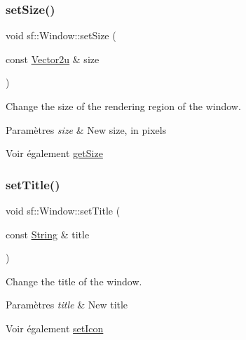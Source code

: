 \subsubsection{\texorpdfstring{set\+Size()}{setSize()}}
{\footnotesize\ttfamily void sf\+::\+Window\+::set\+Size (\begin{DoxyParamCaption}\item[{const \hyperlink{classsf_1_1Vector2}{Vector2u} \&}]{size }\end{DoxyParamCaption})}



Change the size of the rendering region of the window. 


\begin{DoxyParams}{Paramètres}
{\em size} & New size, in pixels\\
\hline
\end{DoxyParams}
\begin{DoxySeeAlso}{Voir également}
\hyperlink{classsf_1_1Window_a3969926741cbe83d7f9eeaf5333d4e71}{get\+Size} 
\end{DoxySeeAlso}
\mbox{\label{classsf_1_1Window_a3b3f3513bb6be90f5cd456c20b5fd5fa}} 
\subsubsection{\texorpdfstring{set\+Title()}{setTitle()}}
{\footnotesize\ttfamily void sf\+::\+Window\+::set\+Title (\begin{DoxyParamCaption}\item[{const \hyperlink{classsf_1_1String}{String} \&}]{title }\end{DoxyParamCaption})}



Change the title of the window. 


\begin{DoxyParams}{Paramètres}
{\em title} & New title\\
\hline
\end{DoxyParams}
\begin{DoxySeeAlso}{Voir également}
\hyperlink{classsf_1_1Window_a63af61e026fba08e3153fd013620bcc0}{set\+Icon} 
\end{DoxySeeAlso}
\mbox{\label{classsf_1_1Window_a59041c4556e0351048f8aff366034f61}} 

